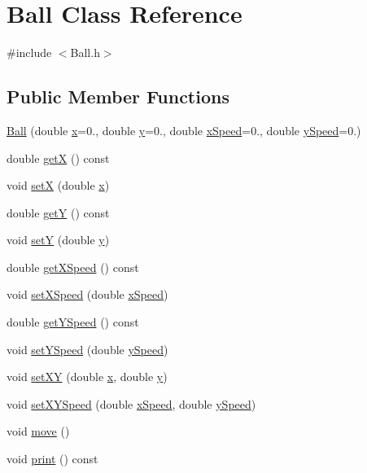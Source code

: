 \hypertarget{classBall}{}\section{Ball Class Reference}
\label{classBall}


{\ttfamily \#include $<$Ball.\+h$>$}

\subsection*{Public Member Functions}
\begin{DoxyCompactItemize}
\item 
\hyperlink{classBall_abfa746ecf867895ba38498da7f19ed28}{Ball} (double \hyperlink{classBall_a60894aab5e27e93bacf2393b9110a049}{x}=0., double \hyperlink{classBall_a17d73231eab81d0e74cf28d0068fe5cb}{y}=0., double \hyperlink{classBall_aa5e337441f77e5c2b904dbd4340eaa20}{x\+Speed}=0., double \hyperlink{classBall_ab69d19321c76e52ef393c83d0d476f91}{y\+Speed}=0.)
\item 
double \hyperlink{classBall_a480a1d4547fea337598d6d5b7fb83d8f}{getX} () const 
\item 
void \hyperlink{classBall_a5499dc9c66f5f79c535ca970b02a9cee}{setX} (double \hyperlink{classBall_a60894aab5e27e93bacf2393b9110a049}{x})
\item 
double \hyperlink{classBall_a28a7fe3223d2c192e0eefaa75074e820}{getY} () const 
\item 
void \hyperlink{classBall_a3216c6c42326d379f4a884993bea7e70}{setY} (double \hyperlink{classBall_a17d73231eab81d0e74cf28d0068fe5cb}{y})
\item 
double \hyperlink{classBall_a0cd3a4b0c425106cc6de1a3c570befab}{get\+X\+Speed} () const 
\item 
void \hyperlink{classBall_a7e60c76532fc86f537b46c93f22d989b}{set\+X\+Speed} (double \hyperlink{classBall_aa5e337441f77e5c2b904dbd4340eaa20}{x\+Speed})
\item 
double \hyperlink{classBall_a6286edef4057f1d13e56712eb3975d50}{get\+Y\+Speed} () const 
\item 
void \hyperlink{classBall_ab5fddfb821ae6e06aa3237f4ebd4bb84}{set\+Y\+Speed} (double \hyperlink{classBall_ab69d19321c76e52ef393c83d0d476f91}{y\+Speed})
\item 
void \hyperlink{classBall_af38e5a6a3556b833cff90c2cd5292713}{set\+XY} (double \hyperlink{classBall_a60894aab5e27e93bacf2393b9110a049}{x}, double \hyperlink{classBall_a17d73231eab81d0e74cf28d0068fe5cb}{y})
\item 
void \hyperlink{classBall_a1063b6a3532786b7147fad5e07182a45}{set\+X\+Y\+Speed} (double \hyperlink{classBall_aa5e337441f77e5c2b904dbd4340eaa20}{x\+Speed}, double \hyperlink{classBall_ab69d19321c76e52ef393c83d0d476f91}{y\+Speed})
\item 
void \hyperlink{classBall_a05228e822d67b25baf715cf09c325494}{move} ()
\item 
void \hyperlink{classBall_afb29247bbe8aa061a1212a0bd3d7c4b8}{print} () const 
\end{DoxyCompactItemize}
